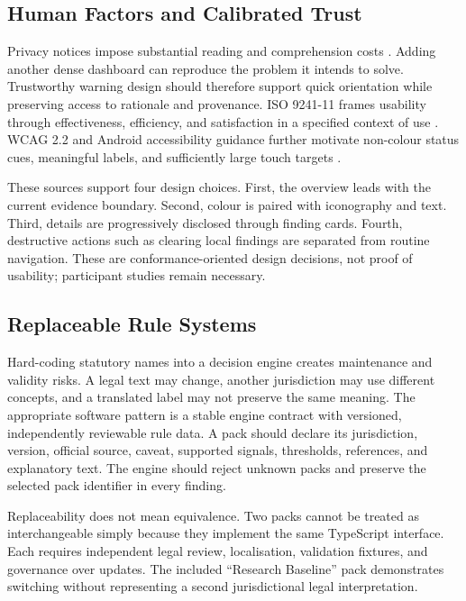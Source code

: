 \subsection{Human Factors and Calibrated Trust}

Privacy notices impose substantial reading and comprehension costs \cite{12,13}. Adding another dense dashboard can reproduce the problem it intends to solve. Trustworthy warning design should therefore support quick orientation while preserving access to rationale and provenance. ISO 9241-11 frames usability through effectiveness, efficiency, and satisfaction in a specified context of use \cite{iso924111}. WCAG 2.2 and Android accessibility guidance further motivate non-colour status cues, meaningful labels, and sufficiently large touch targets \cite{wcag22,androidaccess}.

These sources support four design choices. First, the overview leads with the current evidence boundary. Second, colour is paired with iconography and text. Third, details are progressively disclosed through finding cards. Fourth, destructive actions such as clearing local findings are separated from routine navigation. These are conformance-oriented design decisions, not proof of usability; participant studies remain necessary.

\subsection{Replaceable Rule Systems}

Hard-coding statutory names into a decision engine creates maintenance and validity risks. A legal text may change, another jurisdiction may use different concepts, and a translated label may not preserve the same meaning. The appropriate software pattern is a stable engine contract with versioned, independently reviewable rule data. A pack should declare its jurisdiction, version, official source, caveat, supported signals, thresholds, references, and explanatory text. The engine should reject unknown packs and preserve the selected pack identifier in every finding.

Replaceability does not mean equivalence. Two packs cannot be treated as interchangeable simply because they implement the same TypeScript interface. Each requires independent legal review, localisation, validation fixtures, and governance over updates. The included ``Research Baseline'' pack demonstrates switching without representing a second jurisdictional legal interpretation.

